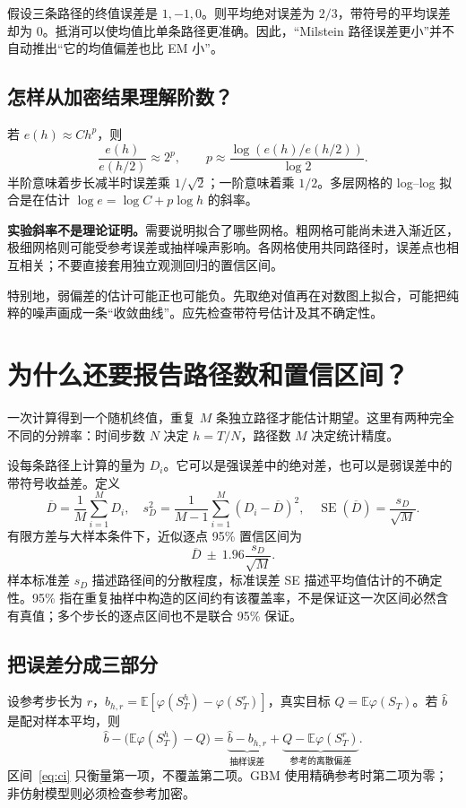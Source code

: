 \documentclass[11pt,a4paper,fontset=none]{ctexart}
\newcommand{\E}{\mathbb E}
\begin{document}
假设三条路径的终值误差是 $1,-1,0$。则平均绝对误差为 $2/3$，带符号的平均误差却为 0。抵消可以使均值比单条路径更准确。因此，“Milstein 路径误差更小”并不自动推出“它的均值偏差也比 EM 小”。

\subsection*{怎样从加密结果理解阶数？}
若 $e(h)\approx Ch^p$，则
\[
\frac{e(h)}{e(h/2)}\approx2^p,
\qquad p\approx\frac{\log(e(h)/e(h/2))}{\log2}.
\]
半阶意味着步长减半时误差乘 $1/\sqrt2$；一阶意味着乘 $1/2$。多层网格的 log--log 拟合是在估计 $\log e=\log C+p\log h$ 的斜率。

\textbf{实验斜率不是理论证明。}需要说明拟合了哪些网格。粗网格可能尚未进入渐近区，极细网格则可能受参考误差或抽样噪声影响。各网格使用共同路径时，误差点也相互相关；不要直接套用独立观测回归的置信区间。

特别地，弱偏差的估计可能正也可能负。先取绝对值再在对数图上拟合，可能把纯粹的噪声画成一条“收敛曲线”。应先检查带符号估计及其不确定性。

\newpage
\section{为什么还要报告路径数和置信区间？}\label{sec:mc}
一次计算得到一个随机终值，重复 $M$ 条独立路径才能估计期望。这里有两种完全不同的分辨率：时间步数 $N$ 决定 $h=T/N$，路径数 $M$ 决定统计精度。

设每条路径上计算的量为 $D_i$。它可以是强误差中的绝对差，也可以是弱误差中的带符号收益差。定义
\[
\overline D=\frac1M\sum_{i=1}^M D_i,
\quad s_D^2=\frac1{M-1}\sum_{i=1}^M(D_i-\overline D)^2,
\quad \operatorname{SE}(\overline D)=\frac{s_D}{\sqrt M}.
\]
有限方差与大样本条件下，近似逐点 95\% 置信区间为
\begin{equation}\label{eq:ci}
\overline D\ \pm\ 1.96\frac{s_D}{\sqrt M}.
\end{equation}
样本标准差 $s_D$ 描述路径间的分散程度，标准误差 SE 描述平均值估计的不确定性。95\% 指在重复抽样中构造的区间约有该覆盖率，不是保证这一次区间必然含有真值；多个步长的逐点区间也不是联合 95\% 保证。

\subsection*{把误差分成三部分}
设参考步长为 $r$，$b_{h,r}=\E[\varphi(S_T^h)-\varphi(S_T^r)]$，真实目标 $Q=\E\varphi(S_T)$。若 $\widehat b$ 是配对样本平均，则
\begin{equation}\label{eq:decomposition}
\widehat b-\bigl(\E\varphi(S_T^h)-Q\bigr)
=\underbrace{\widehat b-b_{h,r}}_{\text{抽样误差}}
 +\underbrace{Q-\E\varphi(S_T^r)}_{\text{参考的离散偏差}}.
\end{equation}
区间~\eqref{eq:ci} 只衡量第一项，不覆盖第二项。GBM 使用精确参考时第二项为零；非仿射模型则必须检查参考加密。
\end{document}
